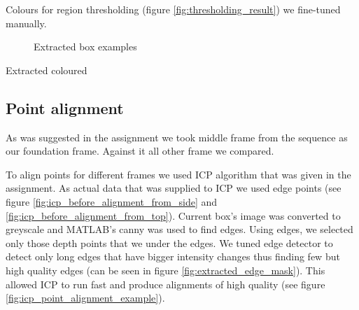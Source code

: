 \documentclass{article}
\begin{document}
Colours for region thresholding (figure \ref{fig:thresholding_result}) we fine-tuned manually.



\begin{figure}[h!]
    \centering
      \caption{Extracted box examples}
\end{figure}

Extracted coloured 

\subsection{Point alignment}
As was suggested in the assignment we took middle frame
from the sequence as our foundation frame. Against it all
other frame we compared.

To align points for different frames we used ICP algorithm
that was given in the assignment. As actual data that was 
supplied to ICP we used edge points 
(see figure \ref{fig:icp_before_alignment_from_side}
and \ref{fig:icp_before_alignment_from_top}).
 Current box's image
was converted to greyscale and MATLAB's canny was used
to find edges. Using edges, we selected only those
depth points that we under the edges. We tuned edge
detector to detect only long edges that have bigger
intensity changes thus finding few but high quality edges
(can be seen in figure \ref{fig:extracted_edge_mask}).
This allowed ICP to run fast and produce alignments
of high quality (see figure \ref{fig:icp_point_alignment_example}).
\end{document}
